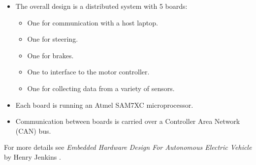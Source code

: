    \renewcommand{\labelitemi}{$\bullet$}
    \renewcommand{\labelitemii}{$\circ$}
    \begin{itemize}
      \item The overall design is a distributed system with 5 boards:
            \begin{itemize}
              \item One for communication with a host laptop.
              \item One for steering.
              \item One for brakes.
              \item One to interface to the motor controller.
              \item One for collecting data from a variety of sensors.
            \end{itemize}

      \item Each board is running an Atmel SAM7XC microprocessor.

      \item Communication between boards is carried over a Controller Area
            Network (CAN) bus.
        
    \end{itemize}

    For more details see \emph{Embedded Hardware Design For Autonomous Electric
    Vehicle} by Henry Jenkins \cite{jenkins_2011}.

